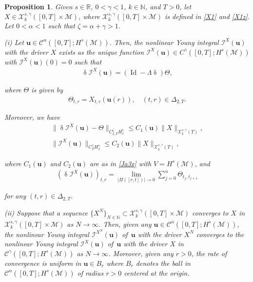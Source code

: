 \documentclass[letterpaper, 11pt,  reqno]{amsart}
\newtheorem{proposition}[theorem]{Proposition}
\DeclareMathOperator{\Id}{Id}
\newcommand{\1}{\hspace{0.5mm}\text{I}\hspace{0.5mm}}
\newcommand{\I}{\mathcal{I}}
\newcommand{\noi}{\noindent}
\newcommand{\R}{\mathbb{R}}
\newcommand{\CC}{\mathcal{C}}
\newcommand{\al}{\alpha}
\newcommand{\updl}{\updelta}
\newcommand{\Dl}{\Delta}
\newcommand{\g}{\gamma}
\newcommand{\M}{\mathcal{M}}
\newcommand{\N}{\mathbb{N}}
\newcommand{\cX}{\mathcal{X}}
\newcommand{\uu}{\mathbf{u}}
\newcommand{\z}{\zeta}
\newcommand{\Ta}{\Theta}
\numberwithin{equation}{section}
\numberwithin{theorem}{section}
\begin{document}
\begin{proposition}\label{PROP:young1}
Given   $s \in \R$, $0 < \g < 1$,  $k \in \N$, and $T >0$, 
let   $X \in \cX^{s, \g}_k([0, T]\times \M)$, 
where $ \cX^{s, \g}_k([0, T]\times \M)$ is  defined  in \eqref{X1}
and \eqref{X1z}.
Let
$0 < \al < 1$
such that 
 $\z  = \al + \g > 1$.





\smallskip

\noi
\textup{(i)}
Let  
  $\uu \in \CC^{\al}([0,T];H^s(\M))$.
 Then, the nonlinear Young integral $\I^X(\uu)$
 with the driver $X$ exists
 as the unique function  
$\I^X(\uu)\in C^\g([0,T]; H^s(\M))$
 with $\I^X(\uu)(0) = 0$
 such that 
 \begin{align}
\updl \I^X(\uu) = (\Id - \Lambda \updl)\Theta, 
\label{Y1}
\end{align}

 
\noi
where $\Ta$ is given by   
\begin{align*}
\Theta_{t,r} = X_{t,r}(\uu(r)), \quad (t,r)\in \Dl_{2,T}.
\end{align*}

\noi
Moreover, we have
\begin{align}
\label{Y2}
\|\updl \I^X(\uu) - \Theta\|_{C^\z_{2,T} H^s_x}
\le
C_1(\uu)\|X\|_{\cX^{s, \g}_k(T)},\\
\label{Y3}
\|\I^X(\uu)\|_{C^\g_T  H^s_x} 
\le
C_2(\uu)\|X\|_{\cX^{s, \g}_k(T)}, 
\end{align}


\noi
where $C_1(\uu)$ and $C_2(\uu)$ are as in \eqref{Ja3x}
with $V = H^s(\M)$, 
and 
\begin{align*}
(\updl \I^X(\uu))_{t,r} = \lim_{|\Pi([r,t])|\to 0} 
\sum^n_{j=0} \Theta_{t_j,t_{j+1}}
\end{align*} 


\noi
for any  $(t,r)\in \Dl_{2,T}$.


\smallskip

\noi
\textup{(ii)}
Suppose that a sequence $\{X^N\}_{N \in \N}\subset 
 \cX^{s, \g}_k([0, T]\times \M)$
 converges to $X$ in 
 $ \cX^{s, \g}_k([0, T]\times \M)$ as $N \to \infty$.
Then, given
any  $\uu \in \CC^{\al}([0,T];H^s(\M))$, 
 the nonlinear Young integral $\I^{X^N}(\uu)$
 of~$\uu$ 
 with the driver $X^N$ 
 converges to 
 the nonlinear Young integral $\I^X(\uu)$
 of~$\uu$ 
 with the driver $X$ 
 in $\CC^\g([0, T]; H^s(\M))$
as $N \to \infty$.
Moreover, 
given any $r > 0$, 
the rate of convergence is
uniform in $\uu \in B_r$ 
where
$B_r$ denotes the ball 
in $\CC^{\al}([0,T];H^s(\M))$
of radius $r > 0$ centered at the origin.


\end{proposition}
\end{document}
